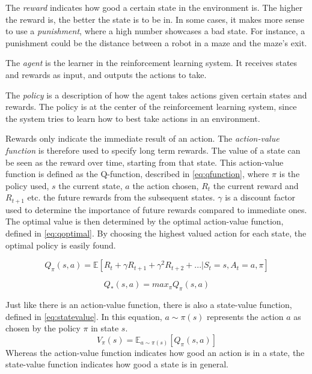 \documentclass{kththesis}
\begin{document}
The \textit{reward} indicates how good a certain state in the environment is. The higher the reward is, the better the state is to be in. In some cases, it makes more sense to use a \textit{punishment}, where a high number showcases a bad state. For instance, a punishment could be the distance between a robot in a maze and the maze's exit. 

The \textit{agent} is the learner in the reinforcement learning system. It receives states and rewards as input, and outputs the actions to take.

The \textit{policy} is a description of how the agent takes actions given certain states and rewards. The policy is at the center of the reinforcement learning system, since the system tries to learn how to best take actions in an environment. \parencite{sutton1998introduction}

Rewards only indicate the immediate result of an action. The \textit{action-value function} is therefore used to specify long term rewards. The value of a state can be seen as the reward over time, starting from that state. This action-value function is defined as the Q-function, described in \autoref{eq:qfunction}, where $\pi$ is the policy used, $s$ the current state, $a$ the action chosen, $R_t$ the current reward and $R_{t+1}$ etc. the future rewards from the subsequent states. $\gamma$ is a discount factor used to determine the importance of future rewards compared to immediate ones. The optimal value is then determined by the optimal action-value function, defined in \autoref{eq:qoptimal}. By choosing the highest valued action for each state, the optimal policy is easily found. \parencite{van2016deep}

\begin{equation}
\label{eq:qfunction}
Q_\pi(s, a) = \mathbb{E}[R_t + \gamma R_{t+1} + \gamma^2R_{t+2} + ... | S_t = s, A_t = a, \pi]
\end{equation}

\begin{equation}
\label{eq:qoptimal}
Q_*(s, a) = max_\pi Q_\pi(s, a)
\end{equation}

Just like there is an action-value function, there is also a state-value function, defined in \autoref{eq:statevalue}. In this equation, $a\sim\pi(s)$ represents the action $a$ as chosen by the policy $\pi$ in state $s$.
\begin{equation}
\label{eq:statevalue}
V_\pi(s) = \mathbb{E}_{a\sim\pi(s)}[Q_\pi(s,a)]
\end{equation}
Whereas the action-value function indicates how good an action is in a state, the state-value function indicates how good a state is in general. \parencite{wang2015dueling}
\end{document}
